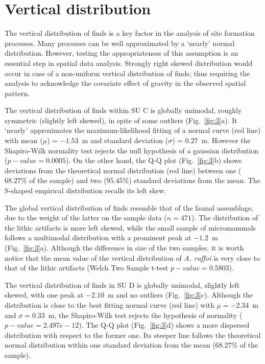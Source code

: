 \documentclass[5p,authoryear]{elsarticle} %
\begin{document}
\section{Vertical distribution}

The vertical distribution of finds is a key factor in the analysis of site formation processes. Many processes can be well approximated by a ‘nearly’ normal distribution. However, testing the appropriateness of this assumption is an essential step in spatial data analysis. Strongly right skewed distribution would occur in case of a non-uniform vertical distribution of finds; thus requiring the analysis to acknowledge the covariate effect of gravity in the observed spatial pattern.

The vertical distribution of finds within SU C is globally unimodal, roughly symmetric (slightly left skewed), in spite of some outliers (Fig.~\ref{fig:3}a). It ‘nearly’ approximates the maximum-likelihood fitting of a normal curve (red line) with mean ($\mu$) = $-1.53$~m and standard deviation ($\sigma$) = $0.27$~m. However the Shapiro-Wilk normality test rejects the null hypothesis of a gaussian distribution ($p-value=0.0005$). On the other hand, the Q-Q plot (Fig.~\ref{fig:3}b) shows deviations from the theoretical normal distribution (red line) between one ($68.27\%$ of the sample) and two ($95.45\%$) standard deviations from the mean. The S-shaped empirical distribution recalls its left skew.

The global vertical distribution of finds resemble that of the faunal assemblage, due to the weight of the latter on the sample data ($n=471$). The distribution of the lithic artifacts is more left skewed, while the small sample of micromammals follows a multimodal distribution with a prominent peak at $-1.2$~m (Fig.~\ref{fig:3}a). Although the difference in size of the two samples, it is worth notice that the mean value of the vertical distribution of \emph{A. ruffoi} is very close to that of the lithic artifacts (Welch Two Sample t-test $p-value=0.5803$).

The vertical distribution of finds in SU D is globally unimodal, slightly left skewed, with one peak at $-2.10$~m and no outliers (Fig.~\ref{fig:3}c). Although the distribution is close to the best fitting normal curve (red line) with $\mu=-2.34$~m and $\sigma=0.33$~m, the Shapiro-Wilk test rejects the hypothesis of normality ($p-value=2.497e-12$). The Q-Q plot (Fig.~\ref{fig:3}d) shows a more dispersed distribution with respect to the former one. Its steeper line follows the theoretical normal distribution within one standard deviation from the mean ($68.27\%$ of the sample).
\end{document}
